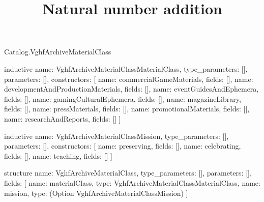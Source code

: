 \begin{lexlean}{Catalog.VghfArchiveMaterialClass}
\title{Natural number addition}
\begin{semanticmodule}
inductive{
  name: VghfArchiveMaterialClassMaterialClass,
  type_parameters: [],
  parameters: [],
  constructors: [
    {name: commercialGameMaterials, fields: []},
    {name: developmentAndProductionMaterials, fields: []},
    {name: eventGuidesAndEphemera, fields: []},
    {name: gamingCulturalEphemera, fields: []},
    {name: magazineLibrary, fields: []},
    {name: pressMaterials, fields: []},
    {name: promotionalMaterials, fields: []},
    {name: researchAndReports, fields: []}
  ]
}

inductive{
  name: VghfArchiveMaterialClassMission,
  type_parameters: [],
  parameters: [],
  constructors: [
    {name: preserving, fields: []},
    {name: celebrating, fields: []},
    {name: teaching, fields: []}
  ]
}

structure{
  name: VghfArchiveMaterialClass,
  type_parameters: [],
  parameters: [],
  fields: [
    {name: materialClass, type: VghfArchiveMaterialClassMaterialClass},
    {name: mission, type: (Option VghfArchiveMaterialClassMission)}
  ]
}
\end{semanticmodule}
\end{lexlean}
